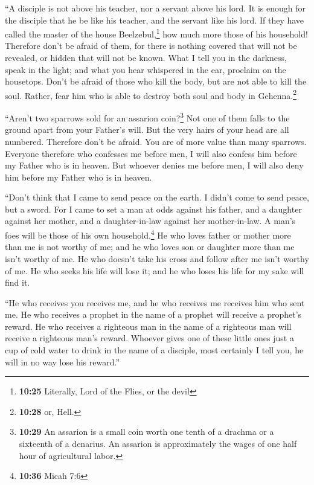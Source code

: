  ``A disciple is not above his teacher, nor a servant
above his lord.  It is enough for the disciple that he be
like his teacher, and the servant like his lord. If they have called the
master of the house Beelzebul,\footnote{\textbf{10:25} Literally, Lord
  of the Flies, or the devil} how much more those of his household!
 Therefore don't be afraid of them, for there is nothing
covered that will not be revealed, or hidden that will not be known.
 What I tell you in the darkness, speak in the light; and
what you hear whispered in the ear, proclaim on the housetops.
 Don't be afraid of those who kill the body, but are not
able to kill the soul. Rather, fear him who is able to destroy both soul
and body in Gehenna.\footnote{\textbf{10:28} or, Hell.}

 ``Aren't two sparrows sold for an assarion
coin?\footnote{\textbf{10:29} An assarion is a small coin worth one
  tenth of a drachma or a sixteenth of a denarius. An assarion is
  approximately the wages of one half hour of agricultural labor.} Not
one of them falls to the ground apart from your Father's will.
 But the very hairs of your head are all numbered.
 Therefore don't be afraid. You are of more value than
many sparrows.  Everyone therefore who confesses me
before men, I will also confess him before my Father who is in heaven.
 But whoever denies me before men, I will also deny him
before my Father who is in heaven.

 ``Don't think that I came to send peace on the earth. I
didn't come to send peace, but a sword.  For I came to
set a man at odds against his father, and a daughter against her mother,
and a daughter-in-law against her mother-in-law.  A man's
foes will be those of his own household.\footnote{\textbf{10:36} Micah
  7:6}  He who loves father or mother more than me is not
worthy of me; and he who loves son or daughter more than me isn't worthy
of me.  He who doesn't take his cross and follow after me
isn't worthy of me.  He who seeks his life will lose it;
and he who loses his life for my sake will find it.

 ``He who receives you receives me, and he who receives
me receives him who sent me.  He who receives a prophet
in the name of a prophet will receive a prophet's reward. He who
receives a righteous man in the name of a righteous man will receive a
righteous man's reward.  Whoever gives one of these
little ones just a cup of cold water to drink in the name of a disciple,
most certainly I tell you, he will in no way lose his reward.''

